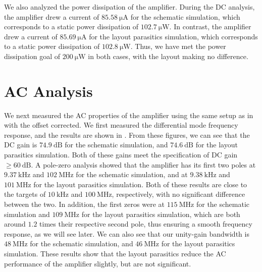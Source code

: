 \documentclass[journal,hidelinks]{IEEEtran}
\begin{document}
  We also analyzed the power dissipation of the amplifier. During the DC analysis, the amplifier drew a current of $\SI{85.58}{\micro\ampere}$ for the schematic simulation, which corresponds to a static power dissipation of $\SI{102.7}{\micro\watt}$. In contrast, the amplifier drew a current of $\SI{85.69}{\micro\ampere}$ for the layout parasitics simulation, which corresponds to a static power dissipation of $\SI{102.8}{\micro\watt}$. Thus, we have met the power dissipation goal of $\SI{200}{\micro\watt}$ in both cases, with the layout making no difference.

\section{AC Analysis}

We next measured the AC properties of the amplifier using the same setup as in  with the offset corrected. We first measured the differential mode frequency response, and the results are shown in . From these figures, we can see that the DC gain is $\SI{74.9}{\deci\bel}$ for the schematic simulation, and $\SI{74.6}{\deci\bel}$ for the layout parasitics simulation. Both of these gains meet the specification of DC gain $\ge \SI{60}{\deci\bel}$.
A pole-zero analysis showed that the amplifier has its first two poles at $\SI{9.37}{\kilo\hertz}$ and $\SI{102}{\mega\hertz}$ for the schematic simulation, and at $\SI{9.38}{\kilo\hertz}$ and $\SI{101}{\mega\hertz}$ for the layout parasitics simulation. Both of these results are close to the targets of $\SI{10}{\kilo\hertz}$ and $\SI{100}{\mega\hertz}$, respectively, with no significant difference between the two. In addition, the first zeros were at $\SI{115}{\mega\hertz}$ for the schematic simulation and $\SI{109}{\mega\hertz}$ for the layout parasitics simulation, which are both around $1.2$ times their respective second pole, thus ensuring a smooth frequency response, as we will see later. We can also see that our unity-gain bandwidth is $\SI{48}{\mega\hertz}$ for the schematic simulation, and $\SI{46}{\mega\hertz}$ for the layout parasitics simulation.
These results show that the layout parasitics reduce the AC performance of the amplifier slightly, but are not significant.
\end{document}
